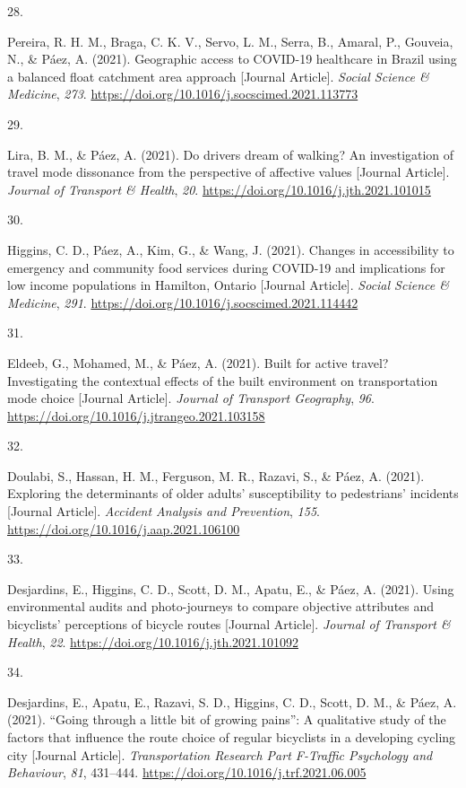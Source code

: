\documentclass[11pt,a4paper,]{awesome-cv}
\newlength{\cslhangindent}
\newlength{\csllabelwidth}
\newenvironment{CSLReferences}[2] %
 {\begin{list}{}{%
  \setlength{\itemindent}{0pt}
  \setlength{\leftmargin}{0pt}
  \setlength{\parsep}{0pt}
  \ifodd #1
   \setlength{\leftmargin}{\cslhangindent}
   \setlength{\itemindent}{-1\cslhangindent}
  \fi
  \setlength{\itemsep}{#2\baselineskip}}}
 {\end{list}}
\newcommand{\CSLLeftMargin}[1]{\parbox[t]{\csllabelwidth}{\strut#1\strut}}
\newcommand{\CSLRightInline}[1]{\parbox[t]{\linewidth - \csllabelwidth}{\strut#1\strut}}
\begin{document}
\begin{CSLReferences}{0}{0}
\CSLLeftMargin{28. }%
\CSLRightInline{Pereira, R. H. M., Braga, C. K. V., Servo, L. M., Serra,
B., Amaral, P., Gouveia, N., \& Páez, A. (2021). Geographic access to
COVID-19 healthcare in Brazil using a balanced float catchment area
approach {[}Journal Article{]}. \emph{Social Science \& Medicine},
\emph{273}. \url{https://doi.org/10.1016/j.socscimed.2021.113773}}

\CSLLeftMargin{29. }%
\CSLRightInline{Lira, B. M., \& Páez, A. (2021). Do drivers dream of
walking? An investigation of travel mode dissonance from the perspective
of affective values {[}Journal Article{]}. \emph{Journal of Transport \&
Health}, \emph{20}. \url{https://doi.org/10.1016/j.jth.2021.101015}}

\CSLLeftMargin{30. }%
\CSLRightInline{Higgins, C. D., Páez, A., Kim, G., \& Wang, J. (2021).
Changes in accessibility to emergency and community food services during
COVID-19 and implications for low income populations in Hamilton,
Ontario {[}Journal Article{]}. \emph{Social Science \& Medicine},
\emph{291}. \url{https://doi.org/10.1016/j.socscimed.2021.114442}}

\CSLLeftMargin{31. }%
\CSLRightInline{Eldeeb, G., Mohamed, M., \& Páez, A. (2021). Built for
active travel? Investigating the contextual effects of the built
environment on transportation mode choice {[}Journal Article{]}.
\emph{Journal of Transport Geography}, \emph{96}.
\url{https://doi.org/10.1016/j.jtrangeo.2021.103158}}

\CSLLeftMargin{32. }%
\CSLRightInline{Doulabi, S., Hassan, H. M., Ferguson, M. R., Razavi, S.,
\& Páez, A. (2021). Exploring the determinants of older adults'
susceptibility to pedestrians' incidents {[}Journal Article{]}.
\emph{Accident Analysis and Prevention}, \emph{155}.
\url{https://doi.org/10.1016/j.aap.2021.106100}}

\CSLLeftMargin{33. }%
\CSLRightInline{Desjardins, E., Higgins, C. D., Scott, D. M., Apatu, E.,
\& Páez, A. (2021). Using environmental audits and photo-journeys to
compare objective attributes and bicyclists' perceptions of bicycle
routes {[}Journal Article{]}. \emph{Journal of Transport \& Health},
\emph{22}. \url{https://doi.org/10.1016/j.jth.2021.101092}}

\CSLLeftMargin{34. }%
\CSLRightInline{Desjardins, E., Apatu, E., Razavi, S. D., Higgins, C.
D., Scott, D. M., \& Páez, A. (2021). {``Going through a little bit of
growing pains''}: A qualitative study of the factors that influence the
route choice of regular bicyclists in a developing cycling city
{[}Journal Article{]}. \emph{Transportation Research Part F-Traffic
Psychology and Behaviour}, \emph{81}, 431--444.
\url{https://doi.org/10.1016/j.trf.2021.06.005}}


\end{CSLReferences}
\end{document}
